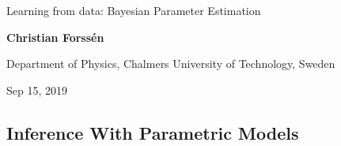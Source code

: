 \documentclass[%
oneside,                 %
final,                   %
10pt]{article}
\begin{document}

\newcommand{\exercisesection}[1]{\subsection*{#1}}







\thispagestyle{empty}

\begin{center}
{\LARGE\bf
\begin{spacing}{1.25}
Learning from data: Bayesian Parameter Estimation
\end{spacing}
}
\end{center}


\begin{center}
{\bf Christian Forssén}
\end{center}

    \begin{center}
\centerline{{\small Department of Physics, Chalmers University of Technology, Sweden}}
\end{center}
    

\begin{center}
Sep 15, 2019
\end{center}

\vspace{1cm}


\subsection{Inference With Parametric Models}
\end{document}
